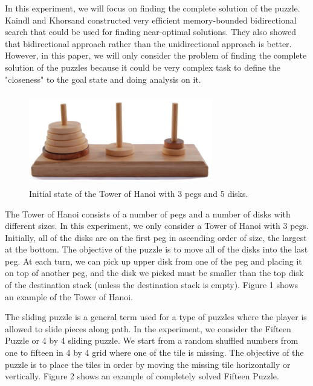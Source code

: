 \documentclass[conference]{IEEEtran}
\begin{document}
In this experiment, we will focus on finding the complete solution of the puzzle. Kaindl and Khorsand constructed very efficient memory-bounded bidirectional search that could be used for finding near-optimal solutions. They also showed that bidirectional approach rather than the unidirectional approach is better. \cite{KandKh} However, in this paper, we will only consider the problem of finding the complete solution of the puzzles because it could be very complex task to define the "closeness" to the goal state and doing analysis on it.

\begin{figure}[!t]
\includegraphics[width=8cm, height=4cm]{towerofhanoi}
\centering
\caption{Initial state of the Tower of Hanoi with 3 pegs and 5 disks.}
\end{figure}

The Tower of Hanoi consists of a number of pegs and a number of disks with different sizes. In this experiment, we only consider a Tower of Hanoi with 3 pegs. Initially, all of the disks are on the first peg in ascending order of size, the largest at the bottom. The objective of the puzzle is to move all of the disks into the last peg. At each turn, we can pick up upper disk from one of the peg and placing it on top of another peg, and the disk we picked must be smaller than the top disk of the destination stack (unless the destination stack is empty). Figure 1 shows an example of the Tower of Hanoi.

The sliding puzzle is a general term used for a type of puzzles where the player is allowed to slide pieces along path. In the experiment, we consider the Fifteen Puzzle or 4 by 4 sliding puzzle. We start from a random shuffled numbers from one to fifteen in 4 by 4 grid where one of the tile is missing. The objective of the puzzle is to place the tiles in order by moving the missing tile horizontally or vertically. Figure 2 shows an example of completely solved Fifteen Puzzle.
\end{document}
